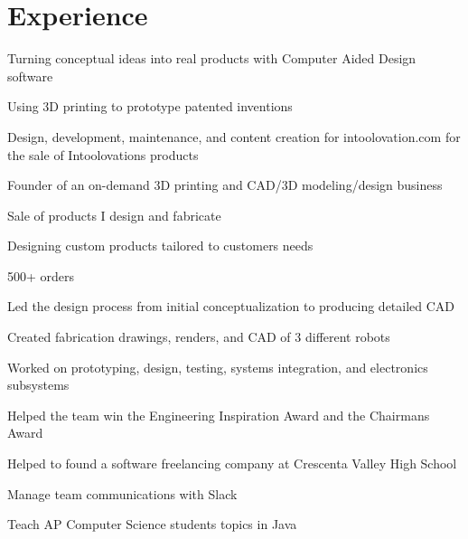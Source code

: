 \documentclass[]{deedy-resume-openfont}
\begin{document}
\section{Experience}
\hfill {}
\begin{tightemize}
	\item Turning conceptual ideas into real products with Computer Aided Design software
	\item Using 3D printing to prototype patented inventions
	\item Design, development, maintenance, and content creation for intoolovation.com for the sale of Intoolovation\textquotesingle{}s products
\end{tightemize}
\sectionsep
{}\hfill {}
\begin{tightemize}
	\item Founder of an on-demand 3D printing and CAD/3D modeling/design business
	\item Sale of products I design and fabricate
	\item Designing custom products tailored to customers\textquotesingle{} needs
	\item 500+ orders
\end{tightemize}
\sectionsep
{}\hfill {}
\begin{tightemize}
	\item Led the design process from initial conceptualization to producing detailed CAD
	\item Created fabrication drawings, renders, and CAD of 3 different robots
	\item Worked on prototyping, design, testing, systems integration, and electronics subsystems
	\item Helped the team win the Engineering Inspiration Award and the Chairman\textquotesingle{}s Award
\end{tightemize}
\sectionsep
{}\hfill {}
\begin{tightemize}
	\item Helped to found a software freelancing company at Crescenta Valley High School
	\item Manage team communications with Slack
	\item Teach AP Computer Science students topics in Java
\end{tightemize}
\sectionsep
%
%
\end{document}
